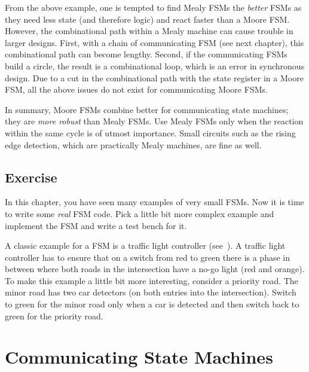 \documentclass[%
    10pt,
    headinclude, footexclude,
    openright, %
    notitlepage,
    cleardoubleempty,
    headsepline,
    pointlessnumbers,
    bibtotoc, idxtotoc,
    ]{scrbook}
\newcommand{\todo}[1]{{\emph{TODO: #1}}}
\renewcommand{\todo}[1]{}
\begin{document}
From the above example, one is tempted to find Mealy FSMs the \emph{better}
FSMs as they need less state (and therefore logic) and react faster than a Moore FSM.
However, the combinational path within a Mealy machine can cause trouble in
larger designs. First, with a chain of communicating FSM (see next chapter), this
combinational path can become lengthy. Second, if the communicating FSMs build
a circle, the result is a combinational loop, which is an error in synchronous design.
Due to a cut in the combinational path with the state register in a Moore FSM,
all the above issues do not exist for communicating Moore FSMs.

In summary, Moore FSMs combine better for communicating state machines; they
are \emph{more robust} than Mealy FSMs. Use Mealy FSMs only when the reaction within the same
cycle is of utmost importance. Small circuits such as the rising edge detection,
which are practically Mealy machines, are fine as well.

\section{Exercise}

In this chapter, you have seen many examples of very small FSMs.
Now it is time to write some \emph{real} FSM code.
Pick a little bit more complex example and implement the FSM and
write a test bench for it.

A classic example for a FSM is a traffic light controller (see~\cite[Section~14.3]{dally:vhdl:2016}).
A traffic light controller has to ensure that on a switch from red to green
there is a phase in between where both roads in the intersection
have a no-go light (red and orange).
To make this example a little bit more interesting, consider a priority road.
The minor road has two car detectors (on both entries into the intersection).
Switch to green for the minor road only when a car is detected and then switch
back to green for the priority road.

\todo{Luca: Greatest common divisor with Euclide algorithm can be also a nice exercise.
Martin: but this is shown at the Chisel homepage without an FSM.}

\todo{Here a more interesting exercise. And not one from Dally.}

\chapter{Communicating State Machines}
\end{document}
